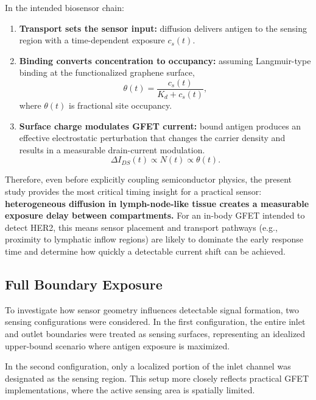 \documentclass[12pt,a4paper]{report}
\begin{document}
In the intended biosensor chain:
\begin{enumerate}
    \item \textbf{Transport sets the sensor input:} diffusion delivers antigen to the sensing region with a time-dependent exposure $c_s(t)$.
    \item \textbf{Binding converts concentration to occupancy:} assuming Langmuir-type binding at the functionalized graphene surface,
    \begin{equation}
        \theta(t)=\frac{c_s(t)}{K_d + c_s(t)},
    \end{equation}
    where $\theta(t)$ is fractional site occupancy.
    \item \textbf{Surface charge modulates GFET current:} bound antigen produces an effective electrostatic perturbation that changes the carrier density and results in a measurable drain-current modulation.
    \begin{equation}
        \Delta I_{DS}(t) \propto N(t) \propto \theta(t).
    \end{equation}
\end{enumerate}

Therefore, even before explicitly coupling semiconductor physics, the present study provides the most critical timing insight for a practical sensor: \textbf{heterogeneous diffusion in lymph-node-like tissue creates a measurable exposure delay between compartments.} For an in-body GFET intended to detect HER2, this means sensor placement and transport pathways (e.g., proximity to lymphatic inflow regions) are likely to dominate the early response time and determine how quickly a detectable current shift can be achieved.

\subsection{Full Boundary Exposure}

To investigate how sensor geometry influences detectable signal formation, two sensing configurations were considered. In the first configuration, the entire inlet and outlet boundaries were treated as sensing surfaces, representing an idealized upper-bound scenario where antigen exposure is maximized. 

In the second configuration, only a localized portion of the inlet channel was designated as the sensing region. This setup more closely reflects practical GFET implementations, where the active sensing area is spatially limited.
\end{document}
